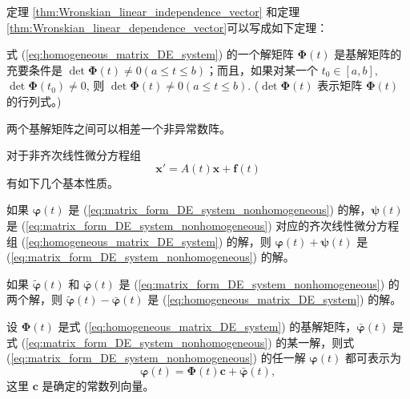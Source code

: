 定理 \ref{thm:Wronskian_linear_independence_vector} 和定理 \ref{thm:Wronskian_linear_dependence_vector}可以写成如下定理：
\begin{theorem}[基解矩阵的充要条件]\label{thm:fundamental_matrix_criterion}
式 (\ref{eq:homogeneous_matrix_DE_system}) 的一个解矩阵 $\boldsymbol{\Phi}(t)$ 是基解矩阵的充要条件是 $\det \boldsymbol{\Phi}(t) \ne 0 (a \le t \le
b)$；而且，如果对某一个 $t_0 \in [a, b]$, $\det \boldsymbol{\Phi}(t_0) \ne 0$, 则 $\det \boldsymbol{\Phi}(t) \ne 0 (a \le t \le b)$.
($\det \boldsymbol{\Phi}(t)$ 表示矩阵 $\boldsymbol{\Phi}(t)$ 的行列式。)
\end{theorem}
\begin{remark}
    两个基解矩阵之间可以相差一个非异常数阵。
\end{remark}

对于非齐次线性微分方程组
\begin{equation}
\mathbf{x}'=A(t)\mathbf{x}+\mathbf{f}(t) \label{eq:matrix_form_DE_system_nonhomogeneous}
\end{equation}
有如下几个基本性质。

\begin{proposition}[非齐次线性微分方程组解的性质]\label{prop:非齐次线性微分方程组解的性质}
    如果 $\boldsymbol{\varphi}(t)$ 是 (\ref{eq:matrix_form_DE_system_nonhomogeneous}) 的解，$\boldsymbol{\psi}(t)$ 是 (\ref{eq:matrix_form_DE_system_nonhomogeneous}) 对应的齐次线性微分方程组 (\ref{eq:homogeneous_matrix_DE_system})
的解，则 $\boldsymbol{\varphi}(t)+\boldsymbol{\psi}(t)$ 是 (\ref{eq:matrix_form_DE_system_nonhomogeneous}) 的解。
\end{proposition}

\begin{proposition}[非齐次和齐次线性微分方程组解的关系]\label{prop:非齐次和齐次线性微分方程组解的关系}
    如果 $\tilde{\boldsymbol{\varphi}}(t)$ 和 $\bar{\boldsymbol{\varphi}}(t)$ 是 (\ref{eq:matrix_form_DE_system_nonhomogeneous}) 的两个解，则 $\tilde{\boldsymbol{\varphi}}(t)-\bar{\boldsymbol{\varphi}}(t)$ 是 (\ref{eq:homogeneous_matrix_DE_system}) 的解。
\end{proposition}

\begin{theorem}[非齐次线性微分方程组解的结构]\label{thm:非齐次线性微分方程组解的结构}
    设 $\boldsymbol{\Phi}(t)$ 是式 (\ref{eq:homogeneous_matrix_DE_system}) 的基解矩阵，$\bar{\boldsymbol{\varphi}}(t)$ 是式 (\ref{eq:matrix_form_DE_system_nonhomogeneous}) 的某一解，则式 (\ref{eq:matrix_form_DE_system_nonhomogeneous}) 的任一解
$\boldsymbol{\varphi}(t)$ 都可表示为
\begin{equation}
\boldsymbol{\varphi}(t) = \boldsymbol{\Phi}(t)\mathbf{c}+\bar{\boldsymbol{\varphi}}(t), \label{eq:nonhomogeneous_general_solution_vector}
\end{equation}
这里 $\mathbf{c}$ 是确定的常数列向量。
\end{theorem}


